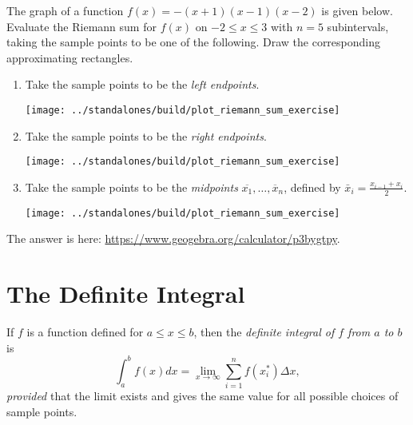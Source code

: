 \documentclass[../main.tex]{subfiles}
\begin{document}
\begin{example}
  The graph of a function \(f(x) = -(x+1)(x-1)(x-2)\) is given below. Evaluate the Riemann sum for \(f(x)\) on \(-2 \le x \le 3\) with \(n=5\) subintervals, taking the sample points to be one of the following. Draw the corresponding approximating rectangles.
  \vspace{2cm}

  \begin{enumerate}
    \item Take the sample points to be the \emph{left endpoints}.

      \texttt{[image: ../standalones/build/plot\_riemann\_sum\_exercise]}
      \vfill

    \item Take the sample points to be the \emph{right endpoints}.

      \texttt{[image: ../standalones/build/plot\_riemann\_sum\_exercise]}
      \vfill

    \item Take the sample points to be the \emph{midpoints} \(\overline{x_{1}}, \dots, \overline{x}_{n}\), defined by \(\bar{x}_{i} = \frac{x_{i-1} + x_{i}}{2}\).

      \texttt{[image: ../standalones/build/plot\_riemann\_sum\_exercise]}
  \end{enumerate}

  {\footnotesize The answer is here: \url{https://www.geogebra.org/calculator/p3bygtpy}.}
\end{example}

\clearpage


\section{The Definite Integral}
\begin{mdframed}[style=withref]
  If \(f\) is a function defined for \(a \le x \le b\), then the \emph{definite integral of \(f\) from \(a\) to \(b\)} is
  \begin{equation}
    {\int_{a}^{b} f(x) dx = \lim_{x \to \infty} \sum_{i=1}^{n} f(x_{i}^{*}) \Delta x,}
  \end{equation}
  \emph{provided} {that the limit exists and gives the same value for all possible choices of sample points. }
  \vspace{1in}

\end{mdframed}
\vfill
\end{document}
